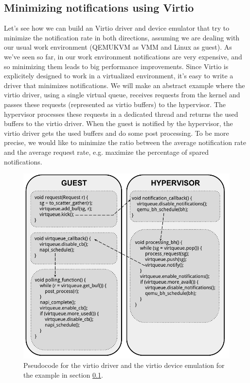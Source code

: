 

\subsection{Minimizing notifications using Virtio}
\label{sec:virtiomin}
Let's see how we can build an Virtio driver and device emulator that try to minimize the notification rate in both directions, assuming we
are dealing with our usual work environment (QEMUKVM as VMM and Linux as guest).
As we've seen so far, in our work environment notifications are very expensive, and so minimizing them leads to big performance
improvements. Since Virtio is explicitely designed to work in a virtualized environment, it's easy to write a driver that minimizes
notifications.
We will make an abstract example where the virtio driver, using a single virtual queue, receives requests from the kernel and passes
these requests (represented as virtio buffers) to the hypervisor. The hypervisor processes these requests in a dedicated thread and returns 
the used buffers to the virtio driver. When the guest is notified by the hypervisor, the virtio driver gets the used buffers and do some
post processing. To be more precise, we would like to minimize the ratio between the average notification rate and the average request rate,
e.g. maximize the percentage of spared notifications.

\vspace{0.5cm}

\begin{figure}[bt]
\centering
\includegraphics[scale = 1.0]{virtiocode.pdf}
\caption{Pseudocode for the virtio driver and the virtio device emulation for the example in section \ref{sec:virtiomin}.}
\label{fig:virtiocode}
\end{figure}

